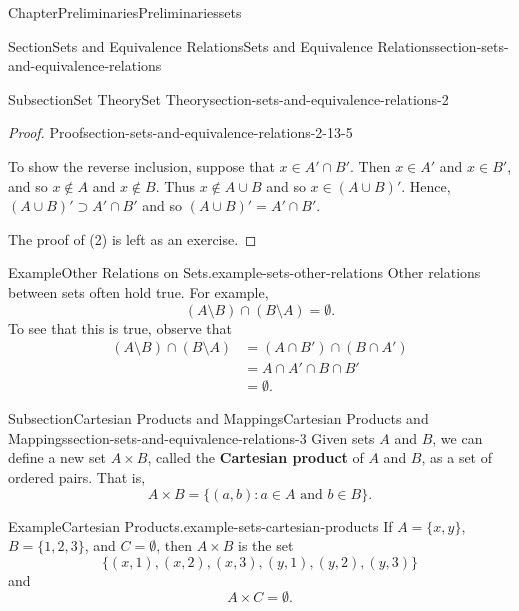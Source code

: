 \documentclass[oneside,10pt,]{book}
\newcommand{\terminology}[1]{\textbf{#1}}
\numberwithin{equation}{section}
\begin{document}
\begin{chapterptx}{Chapter}{Preliminaries}{}{Preliminaries}{}{}{sets}
\begin{sectionptx}{Section}{Sets and Equivalence Relations}{}{Sets and Equivalence Relations}{}{}{section-sets-and-equivalence-relations}
\begin{subsectionptx}{Subsection}{Set Theory}{}{Set Theory}{}{}{section-sets-and-equivalence-relations-2}
\begin{proof}{Proof}{}{section-sets-and-equivalence-relations-2-13-5}
\par
To show the reverse inclusion, suppose that \(x \in A' \cap B'\).  Then \(x \in A'\) and \(x \in B'\), and so \(x \notin A\) and \(x \notin B\). Thus \(x \notin A \cup B\) and so \(x \in (A \cup B)'\).  Hence, \((A \cup B)' \supset A' \cap B'\) and so \((A \cup B)' = A' \cap B'\).%
\par
The proof of (2) is left as an exercise.%
\end{proof}
\begin{example}{Example}{Other Relations on Sets.}{example-sets-other-relations}%
Other relations between sets often hold true. For example,%
\begin{equation*}
( A \setminus B) \cap (B \setminus A) = \emptyset\text{.}
\end{equation*}
To see that this is true, observe that%
\begin{align*}
( A \setminus B) \cap (B \setminus A) & = ( A \cap B') \cap (B \cap A')\\
& = A \cap A' \cap B \cap B'\\
& = \emptyset\text{.}
\end{align*}
%
\end{example}
\end{subsectionptx}
%
%
\typeout{************************************************}
\typeout{************************************************}
%
\begin{subsectionptx}{Subsection}{Cartesian Products and Mappings}{}{Cartesian Products and Mappings}{}{}{section-sets-and-equivalence-relations-3}
Given sets \(A\) and \(B\), we can define a new set \(A \times B\), called the \terminology{Cartesian product}  of \(A\) and \(B\), as a set of ordered pairs.  That is, \label{section-sets-and-equivalence-relations-3-2-7}%
\begin{equation*}
A \times B = \{ (a,b) : a \in A \text{ and } b \in B \}\text{.}
\end{equation*}
%
\begin{example}{Example}{Cartesian Products.}{example-sets-cartesian-products}%
If \(A = \{ x, y \}\), \(B = \{ 1, 2, 3 \}\), and \(C = \emptyset\), then \(A \times B\) is the set%
\begin{equation*}
\{ (x, 1), (x, 2), (x, 3), (y, 1), (y, 2), (y, 3) \}
\end{equation*}
and%
\begin{equation*}
A \times C = \emptyset\text{.}
\end{equation*}

\end{example}
\end{subsectionptx}
\end{sectionptx}
\end{chapterptx}
\end{document}

